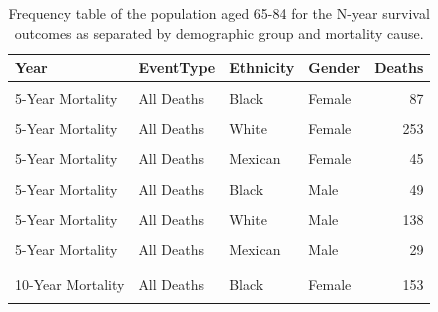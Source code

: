 \documentclass[
]{article}
\begin{document}
\begin{table}[!h]
\centering
\caption{\label{tab:DeathFreq2}Frequency table of the population aged 65-84 for the N-year survival outcomes as separated by demographic group and mortality cause.}
\centering
\begin{tabular}[t]{llllr}
\toprule
Year & EventType & Ethnicity & Gender & Deaths\\
\midrule
\cellcolor{gray!10}{5-Year Mortality} & \cellcolor{gray!10}{CVD} & \cellcolor{gray!10}{Black} & \cellcolor{gray!10}{Female} & \cellcolor{gray!10}{35}\\
5-Year Mortality & All Deaths & Black & Female & 87\\
\cellcolor{gray!10}{5-Year Mortality} & \cellcolor{gray!10}{CVD} & \cellcolor{gray!10}{White} & \cellcolor{gray!10}{Female} & \cellcolor{gray!10}{92}\\
5-Year Mortality & All Deaths & White & Female & 253\\
\cellcolor{gray!10}{5-Year Mortality} & \cellcolor{gray!10}{CVD} & \cellcolor{gray!10}{Mexican} & \cellcolor{gray!10}{Female} & \cellcolor{gray!10}{15}\\
5-Year Mortality & All Deaths & Mexican & Female & 45\\
\cellcolor{gray!10}{5-Year Mortality} & \cellcolor{gray!10}{CVD} & \cellcolor{gray!10}{Black} & \cellcolor{gray!10}{Male} & \cellcolor{gray!10}{19}\\
5-Year Mortality & All Deaths & Black & Male & 49\\
\cellcolor{gray!10}{5-Year Mortality} & \cellcolor{gray!10}{CVD} & \cellcolor{gray!10}{White} & \cellcolor{gray!10}{Male} & \cellcolor{gray!10}{55}\\
5-Year Mortality & All Deaths & White & Male & 138\\
\cellcolor{gray!10}{5-Year Mortality} & \cellcolor{gray!10}{CVD} & \cellcolor{gray!10}{Mexican} & \cellcolor{gray!10}{Male} & \cellcolor{gray!10}{10}\\
5-Year Mortality & All Deaths & Mexican & Male & 29\\
\addlinespace\\
\cellcolor{gray!10}{10-Year Mortality} & \cellcolor{gray!10}{CVD} & \cellcolor{gray!10}{Black} & \cellcolor{gray!10}{Female} & \cellcolor{gray!10}{56}\\
10-Year Mortality & All Deaths & Black & Female & 153\\
\cellcolor{gray!10}{10-Year Mortality} & \cellcolor{gray!10}{CVD} & \cellcolor{gray!10}{White} & \cellcolor{gray!10}{Female} & \cellcolor{gray!10}{187}\\

\end{tabular}
\end{table}
\end{document}
